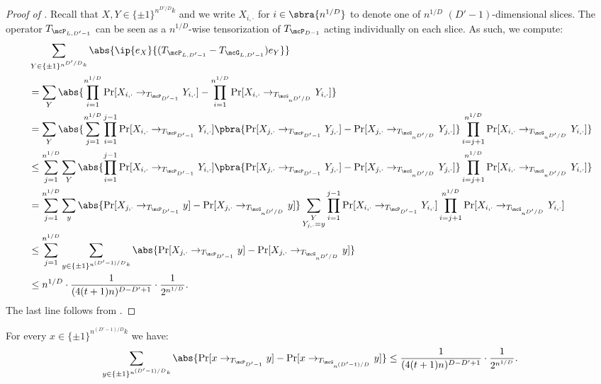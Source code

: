 \begin{proof}[Proof of ]
Recall that $X, Y \in \{\pm1\}^{n^{D'/D}k}$ and we write $X_{i, \cdot}$ for $i \in \sbra{n^{1/D}}$ to denote one of $n^{1/D}$ $(D'-1)$-dimensional slices. The operator $T_{\mcP_{L, D'-1}}$ can be seen as a $n^{1/D}$-wise tensorization of $T_{\mcP_{D-1}}$ acting individually on each slice. As such, we compute:
\begin{align*}
    &\sum_{Y \in \{\pm1\}^{n^{D'/D}k}} \abs{\ip{e_X}{(T_{\mcP_{L, D'-1}}-T_{\mcG_{L, D'-1}}) e_Y}}\\
    &=\sum_Y \abs{ \prod_{i=1}^{n^{1/D}}\Pr[X_{i, \cdot} \to_{T_{\mcP_{D'-1}}} Y_{i ,\cdot}] - \prod_{i=1}^{n^{1/D}}\Pr[X_{i, \cdot} \to_{T_{\mcG_{n^{D'/D}}}} Y_{i ,\cdot}]}\\
    &=\sum_Y \abs{\sum_{j = 1}^{n^{1/D}} \prod_{i=1}^{j-1}\Pr[X_{i, \cdot} \to_{T_{\mcP_{D'-1}}} Y_{i ,\cdot}] \pbra{\Pr[X_{j, \cdot} \to_{T_{\mcP_{D'-1}}} Y_{j ,\cdot}] - \Pr[X_{j, \cdot} \to_{T_{\mcG_{n^{D'/D}}}} Y_{j ,\cdot}]} \prod_{i=j+1}^{n^{1/D}}\Pr[X_{i, \cdot} \to_{T_{\mcG_{n^{D'/D}}}} Y_{i ,\cdot}]}\\
    &\leq  \sum_{j = 1}^{n^{1/D}} \sum_Y \abs{\prod_{i=1}^{j-1}\Pr[X_{i, \cdot} \to_{T_{\mcP_{D'-1}}} Y_{i ,\cdot}] \pbra{\Pr[X_{j, \cdot} \to_{T_{\mcP_{D'-1}}} Y_{j ,\cdot}] - \Pr[X_{j, \cdot} \to_{T_{\mcG_{n^{D'/D}}}} Y_{j ,\cdot}]} \prod_{i=j+1}^{n^{1/D}}\Pr[X_{i, \cdot} \to_{T_{\mcG_{n^{D'/D}}}} Y_{i ,\cdot}]}\\
    &= \sum_{j = 1}^{n^{1/D}} \sum_y \abs{\Pr[X_{j, \cdot} \to_{T_{\mcP_{D'-1}}} y] - \Pr[X_{j, \cdot} \to_{T_{\mcG_{n^{D'/D}}}} y]} \sum_{\substack{Y\\ Y_{j, \cdot} = y}} \prod_{i=1}^{j-1}\Pr[X_{i, \cdot} \to_{T_{\mcP_{D'-1}}} Y_{i ,\cdot}] \prod_{i=j+1}^{n^{1/D}}\Pr[X_{i, \cdot} \to_{T_{\mcG_{n^{D'/D}}}} Y_{i ,\cdot}]\\
    &\leq \sum_{j = 1}^{n^{1/D}} \sum_{y \in \{\pm1\}^{n^{(D'-1)/D}k}} \abs{\Pr[X_{j, \cdot} \to_{T_{\mcP_{D'-1}}} y] - \Pr[X_{j, \cdot} \to_{T_{\mcG_{n^{D'/D}}}} y]}\\
    &\leq n^{1/D}\cdot \frac{1}{(4(t+1)n)^{D-D'+1}} \cdot \frac1{2^{n^{1/D}}}.
\end{align*}
The last line follows from .
\end{proof}


\begin{lemma}
    \label{genkwiseimplies}
    For every $x \in \{\pm1\}^{n^{(D'-1)/D}k}$ we have:
    \begin{equation*}
        \sum_{y \in \{\pm1\}^{n^{(D'-1)/D}k}} \abs{\Pr[x \to_{T_{\mcP_{D'-1}}} y] - \Pr[x \to_{T_{\mcG_{n^{(D'-1)/D}}}} y]} \leq \frac{1}{(4(t+1)n)^{D-D'+1}} \cdot \frac1{2^{n^{1/D}}}.
    \end{equation*}
\end{lemma}

